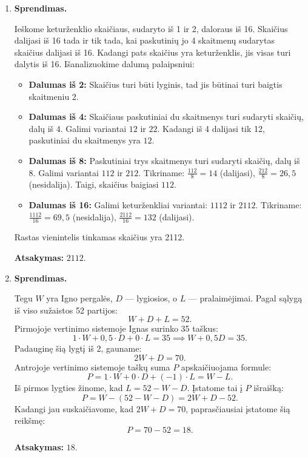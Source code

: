 \documentclass[11pt,a4paper]{article}
\begin{document}
\begin{enumerate}
    \textbf{Atsakymas:} $(26, 82)$ ir $(28, 76)$.

    \vspace{0.3cm}
    \item \textbf{Sprendimas.}
    
    Ieškome keturženklio skaičiaus, sudaryto iš 1 ir 2, daloraus iš 16. Skaičius dalijasi iš 16 tada ir tik tada, kai paskutinių jo 4 skaitmenų sudarytas skaičius dalijasi iš 16. Kadangi pats skaičius yra keturženklis, jis visas turi dalytis iš 16.
    Išanalizuokime dalumą palaipsniui:
    \begin{itemize}
        \item \textbf{Dalumas iš 2:} Skaičius turi būti lyginis, tad jis būtinai turi baigtis skaitmeniu 2.
        \item \textbf{Dalumas iš 4:} Skaičiaus paskutiniai du skaitmenys turi sudaryti skaičių, dalų iš 4. Galimi variantai $12$ ir $22$. Kadangi iš 4 dalijasi tik 12, paskutiniai du skaitmenys yra $12$.
        \item \textbf{Dalumas iš 8:} Paskutiniai trys skaitmenys turi sudaryti skaičių, dalų iš 8. Galimi variantai $112$ ir $212$. Tikriname: $\frac{112}{8} = 14$ (dalijasi), $\frac{212}{8} = 26{,}5$ (nesidalija). Taigi, skaičius baigiasi $112$.
        \item \textbf{Dalumas iš 16:} Galimi keturženkliai variantai: $1112$ ir $2112$.
        Tikriname: $\frac{1112}{16} = 69{,}5$ (nesidalija), $\frac{2112}{16} = 132$ (dalijasi).
    \end{itemize}
    Rastas vienintelis tinkamas skaičius yra 2112.
    
    \textbf{Atsakymas:} $2112$.

    \vspace{0.3cm}
    \item \textbf{Sprendimas.}
    
    Tegu $W$ yra Igno pergalės, $D$ --- lygiosios, o $L$ --- pralaimėjimai. Pagal sąlygą iš viso sužaistos 52 partijos:
    \[ W + D + L = 52. \]
    Pirmojoje vertinimo sistemoje Ignas surinko 35 taškus:
    \[ 1 \cdot W + 0{,}5 \cdot D + 0 \cdot L = 35 \implies W + 0{,}5D = 35. \]
    Padauginę šią lygtį iš 2, gauname:
    \[ 2W + D = 70. \]
    Antrojoje vertinimo sistemoje taškų suma $P$ apskaičiuojama formule:
    \[ P = 1 \cdot W + 0 \cdot D + (-1) \cdot L = W - L. \]
    Iš pirmos lygties žinome, kad $L = 52 - W - D$. Įstatome tai į $P$ išraišką:
    \[ P = W - (52 - W - D) = 2W + D - 52. \]
    Kadangi jau suskaičiavome, kad $2W + D = 70$, paprasčiausiai įstatome šią reikšmę:
    \[ P = 70 - 52 = 18. \]
    
    \textbf{Atsakymas:} $18$.
\end{enumerate}
\end{document}
